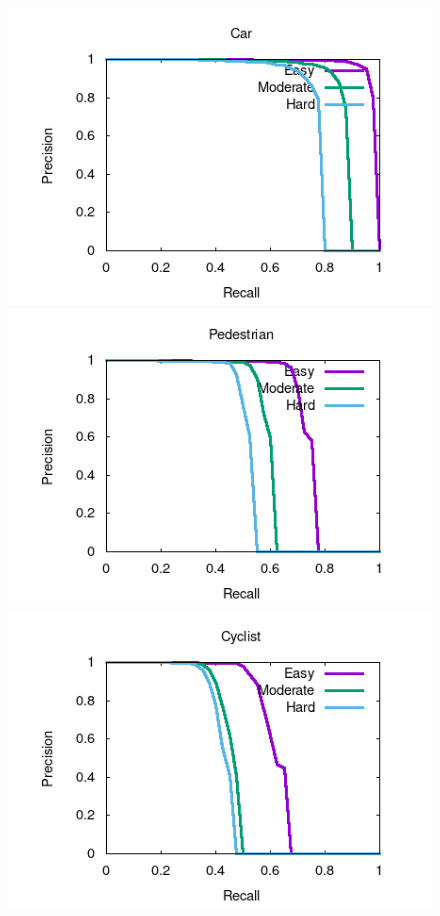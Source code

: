 \begin{figure}[H]
	\begin{minipage}{0.333\textwidth}
		\centering
		\includegraphics[width=1\linewidth]{Book/figures/9_completo/car_detection_ground.png}
	\end{minipage}\hfill
	\begin{minipage}{0.333\textwidth}
		\centering
		\includegraphics[width=1\linewidth]{Book/figures/9_completo/pedestrian_detection_ground.png}
	\end{minipage}\hfill
	\begin{minipage}{0.333\textwidth}
		\centering
		\includegraphics[width=1\linewidth]{Book/figures/9_completo/cyclist_detection_ground.png}

\end{minipage}
\end{figure}
